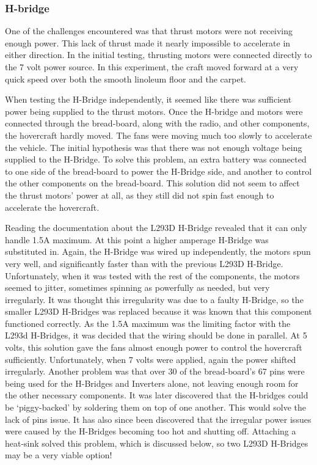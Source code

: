 \subsubsection{H-bridge}
One of the challenges encountered was that thrust motors were not receiving enough power. This lack of thrust made it nearly impossible to accelerate in either direction. In the initial testing, thrusting motors were connected directly to the 7 volt power source. In this experiment, the craft moved forward at a very quick speed over both the smooth linoleum floor and the carpet.

When testing the H-Bridge independently, it seemed like there was sufficient power being supplied to the thrust motors. Once the H-bridge and motors were connected through the bread-board, along with the radio, and other components, the hovercraft hardly moved. The fans were moving much too slowly to accelerate the vehicle. The initial hypothesis was that there was not enough voltage being supplied to the H-Bridge. To solve this problem, an extra battery was connected to one side of the bread-board to power the H-Bridge side, and another to control the other components on the bread-board. This solution did not seem to affect the thrust motors' power at all, as they still did not spin fast enough to accelerate the hovercraft.

Reading the documentation about the L293D H-Bridge revealed that it can only handle 1.5A maximum. At this point a higher amperage H-Bridge was substituted in. Again, the H-Bridge was wired up independently, the motors spun very well, and significantly faster than with the previous L293D H-Bridge. Unfortunately, when it was tested with the rest of the components, the motors seemed to jitter, sometimes spinning as powerfully as needed, but very irregularly. It was thought this irregularity was due to a faulty H-Bridge, so the smaller L293D H-Bridges was replaced because it was known that this component functioned correctly. As the 1.5A maximum was the limiting factor with the L293d H-Bridges, it was decided that the wiring should be done in parallel. At 5 volts, this solution gave the fans almost enough power to control the hovercraft sufficiently. Unfortunately, when 7 volts were applied, again the power shifted irregularly. Another problem was that over 30 of the bread-board's 67 pins were being used for the H-Bridges and Inverters alone, not leaving enough room for the other necessary components. It was later discovered that the H-bridges could be `piggy-backed' by soldering them on top of one another. This would solve the lack of pins issue. It has also since been discovered that the irregular power issues were caused by the H-Bridges becoming too hot and shutting off. Attaching a heat-sink solved this problem, which is discussed below, so two L293D H-Bridges may be a very viable option!

